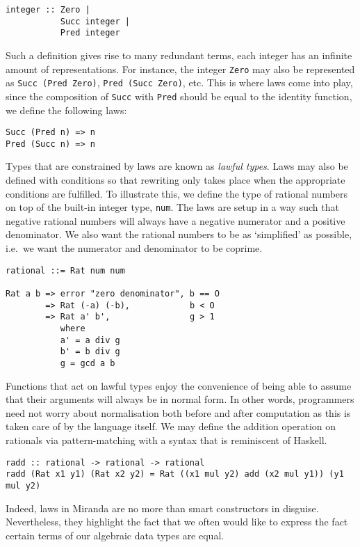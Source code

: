 \documentclass[12pt,twoside,maitrise]{dms}
\theoremstyle{definition}
\numberwithin{equation}{section}
\numberwithin{table}{chapter}
\numberwithin{figure}{chapter}
\newcommand\id[1] {\texttt{#1}}
\newcommand\fn[1] {\texttt{#1}}
\begin{document}
\begin{verbatim}
integer :: Zero |
           Succ integer |
           Pred integer
\end{verbatim}

Such a definition gives rise to many redundant terms, each integer has an
infinite amount of representations. For instance, the integer \id{Zero} may also
be represented as \fn{Succ (Pred Zero)}, \fn{Pred (Succ Zero)}, etc. This is
where laws come into play, since the composition of \id{Succ} with \id{Pred}
should be equal to the identity function, we define the following laws:

\begin{verbatim}
Succ (Pred n) => n
Pred (Succ n) => n
\end{verbatim}

Types that are constrained by laws are known as \emph{lawful types}. Laws may
also be defined with conditions so that rewriting only takes place when the
appropriate conditions are fulfilled. To illustrate this, we define the type of
rational numbers on top of the built-in integer type, \id{num}. The laws are
setup in a way such that negative rational numbers will always have a negative
numerator and a positive denominator. We also want the rational numbers to be as
`simplified' as possible, i.e.\ we want the numerator and denominator to be
coprime.

\begin{verbatim}
rational ::= Rat num num

Rat a b => error "zero denominator", b == O
        => Rat (-a) (-b),            b < O
        => Rat a' b',                g > 1
           where
           a' = a div g
           b' = b div g
           g = gcd a b
\end{verbatim}

Functions that act on lawful types enjoy the convenience of being able to assume
that their arguments will always be in normal form. In other words, programmers
need not worry about normalisation both before and after computation as this is
taken care of by the language itself. We may define the addition operation on
rationals via pattern-matching with a syntax that is reminiscent of Haskell.

\begin{verbatim}
radd :: rational -> rational -> rational
radd (Rat x1 y1) (Rat x2 y2) = Rat ((x1 mul y2) add (x2 mul y1)) (y1 mul y2)
\end{verbatim}

Indeed, laws in Miranda are no more than smart constructors in disguise.
Nevertheless, they highlight the fact that we often would like to express the
fact certain terms of our algebraic data types are equal.
\end{document}
